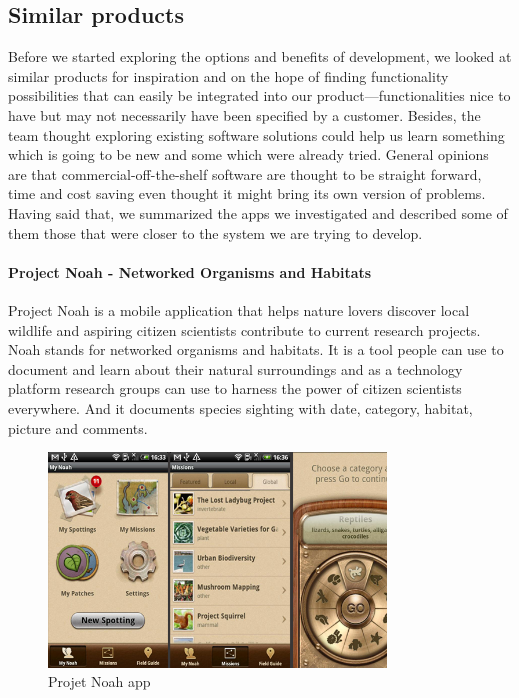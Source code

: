 \subsection{Similar products}
Before we started exploring the options and benefits of development, we looked at similar products for inspiration and on the hope of finding functionality possibilities that can easily be integrated into our product---functionalities nice to have but may not necessarily have been specified by a customer. Besides, the team thought exploring existing software solutions could help us learn something which is going to be new and some which were already tried. General opinions are that commercial-off-the-shelf software are thought to be straight forward, time and cost saving even thought it might bring its own version of problems\cite{similarproduct:introdn}. Having said that, we summarized the apps we investigated and described some of them those that were closer to the system we are trying to develop.
\paragraph{Project Noah - Networked Organisms and Habitats}

Project Noah is a mobile application that helps nature lovers discover local wildlife and aspiring citizen scientists contribute to current research  projects. Noah stands for networked organisms and habitats. It is a tool people can use to document and learn about their  natural surroundings and as a technology platform research groups can  use to harness the power of citizen scientists everywhere. And it documents species sighting with date, category, habitat, picture and comments\cite{similarproduct:noah}.

\begin{figure}[htb]
    \centering
    \includegraphics[width=0.8\textwidth]{introduction/project_description/noah.png}
    \caption{Projet Noah app}
    \label{fig:Noahapp}
\end{figure}
\
